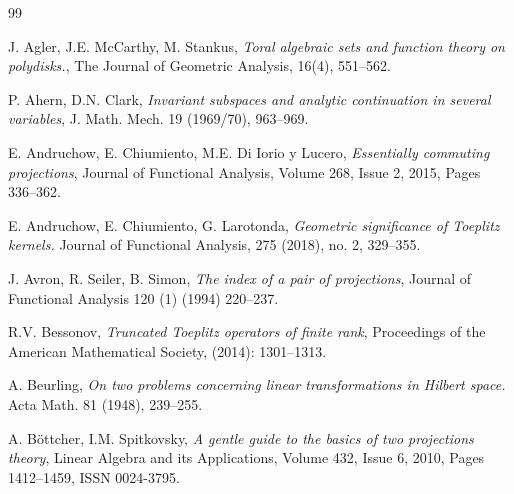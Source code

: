 \documentclass[12pt, a4 paper]{amsart}
\theoremstyle{definition}
\theoremstyle{plain}
\theoremstyle{definition}
\numberwithin{equation}{section}
\begin{document}
\begin{thebibliography}{99}

J. Agler, J.E. McCarthy, M. Stankus,
\emph{Toral algebraic sets and function theory on polydisks.}, The Journal of Geometric Analysis, 16(4), 551--562.

P. Ahern, D.N. Clark, 
\emph{Invariant subspaces and analytic continuation in several variables}, J. Math. Mech. 19 (1969/70), 963--969.


E. Andruchow, E. Chiumiento, M.E. Di Iorio y Lucero,
\emph{Essentially commuting projections},
Journal of Functional Analysis, Volume 268, Issue 2, 2015, Pages 336--362.

E. Andruchow, E. Chiumiento, G. Larotonda, 
\emph{Geometric significance of Toeplitz kernels.}
Journal of Functional Analysis, 275 (2018), no. 2, 329--355.


J. Avron, R. Seiler, B. Simon, 
\emph{The index of a pair of projections}, Journal of Functional Analysis 120 (1) (1994) 220--237.



R.V. Bessonov,
\emph{Truncated Toeplitz operators of finite rank}, Proceedings of the American Mathematical Society, (2014): 1301--1313.

A. Beurling, 
\emph{On two problems concerning linear transformations in Hilbert space.} Acta Math. 81 (1948), 239--255.


A. Böttcher, I.M. Spitkovsky,
\emph{A gentle guide to the basics of two projections theory}, Linear Algebra and its Applications, Volume 432, Issue 6, 2010, Pages 1412--1459, ISSN 0024-3795.


\end{thebibliography}
\end{document}
